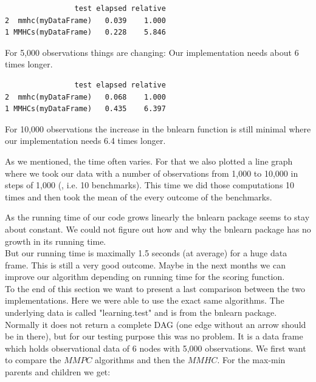 	\begin{program}
		\begin{snugshade}
  			\begin{verbatim}
                test elapsed relative
2  mmhc(myDataFrame)   0.039    1.000
1 MMHCs(myDataFrame)   0.228    5.846
			\end{verbatim}
 		\end{snugshade}
		\caption{For 5,000 observations things are changing: Our implementation needs about 6 times longer. }
 	\end{program}

	\begin{program}
		\begin{snugshade}
  			\begin{verbatim}
                test elapsed relative
2  mmhc(myDataFrame)   0.068    1.000
1 MMHCs(myDataFrame)   0.435    6.397
			\end{verbatim}
 		\end{snugshade}
		\caption{For 10,000 observations the increase in the bnlearn function is still minimal where our implementation needs 6.4 times longer.}
 	\end{program}

 	As we mentioned, the time often varies. For that we also plotted a line graph where we took our data with a number of observations from 1,000 to 10,000 in steps of 1,000 (, i.e. 10 benchmarks). This time we did those computations 10 times and then took the mean of the every outcome of the benchmarks.


	As the running time of our code grows linearly the bnlearn package seems to stay about constant. We could not figure out how and why the bnlearn package has no growth in its running time.\\
	But our running time is maximally 1.5 seconds (at average) for a huge data frame. This is still a very good outcome. Maybe in the next months we can improve our algorithm depending on running time for the scoring function.\\

	To the end of this section we want to present a last comparison between the two implementations. Here we were able to use the exact same algorithms. The underlying data is called "learning.test" and is from the bnlearn package. Normally it does not return a complete DAG (one edge without an arrow should be in there), but for our testing purpose this was no problem. It is a data frame which holds observational data of 6 nodes with 5,000 observations. We first want to compare the $MMPC$ algorithms and then the $MMHC$. For the max-min parents and children we get:

